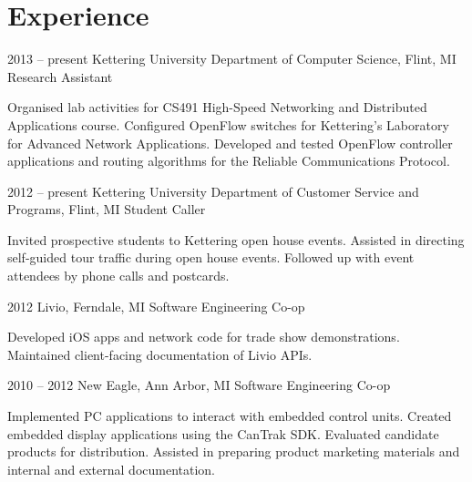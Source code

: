 \documentclass[12pt]{tccv/actccv}
\begin{document}
\address{PO Box 320426, Flint, MI 48532}

\maketitle

\section{Experience}

\begin{eventlist}
\item{2013 -- present}
     {Kettering University Department of Computer Science, Flint, MI}
     {Research Assistant}
     
     Organised lab activities for CS491 High-Speed Networking and 
     Distributed Applications course. Configured OpenFlow switches 
     for Kettering's Laboratory for Advanced Network Applications.
     Developed and tested OpenFlow controller applications and routing algorithms 
     for the Reliable Communications Protocol.

\item{2012 -- present}
     {Kettering University Department of Customer Service and Programs, Flint, MI}
     {Student Caller}
     
     Invited prospective students to Kettering open house events.
     Assisted in directing self-guided tour traffic during open house events.
     Followed up with event attendees by phone calls and postcards.
     
\item{2012}
     {Livio, Ferndale, MI}
     {Software Engineering Co-op}
     
     Developed iOS apps and network code for trade show demonstrations.
     Maintained client-facing documentation of Livio APIs.
     
\item{2010 -- 2012}
     {New Eagle, Ann Arbor, MI}
     {Software Engineering Co-op}
     
     Implemented PC applications to interact with embedded control units.
     Created embedded display applications using the CanTrak SDK.
     Evaluated candidate products for distribution.
     Assisted in preparing product marketing materials and internal and 
     external documentation.
     
\end{eventlist}
\end{document}

